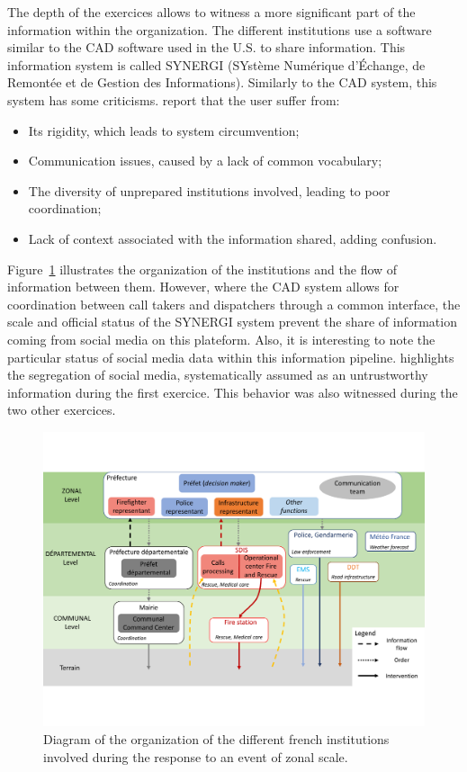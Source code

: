 The depth of the exercices allows to witness a more significant part of the information within the organization.
The different institutions use a software similar to the CAD software used in the U.S. to share information.
This information system is called SYNERGI (SYstème Numérique d’Échange, de Remontée et de Gestion des Informations).
Similarly to the CAD system, this system has some criticisms.
\textcite{linotPerspectiveComputationnelleDefi2018} report that the user suffer from:

\begin{itemize}
    \item Its rigidity, which leads to system circumvention;
    \item Communication issues, caused by a lack of common vocabulary;
    \item The diversity of unprepared institutions involved, leading to poor coordination;
    \item Lack of context associated with the information shared, adding confusion.
\end{itemize}

Figure~\ref{information:french-orga} illustrates the organization of the institutions and the flow of information between them.
However, where the CAD system allows for coordination between call takers and dispatchers through a common interface, the scale and official status of the SYNERGI system prevent the share of information coming from social media on this plateform.
Also, it is interesting to note the particular status of social media data within this information pipeline.
\textcite{castagninoWhatCanWe2019} highlights the segregation of social media, systematically assumed as an untrustworthy information during the first exercice.
This behavior was also witnessed during the two other exercices.

\begin{figure}[htb]
    \centering
    \includegraphics[width=\textwidth]{figures/chap-3/french-orga.pdf}
    \caption{Diagram of the organization of the different french institutions involved during the response to an event of zonal scale.}
    \label{information:french-orga}
\end{figure}

